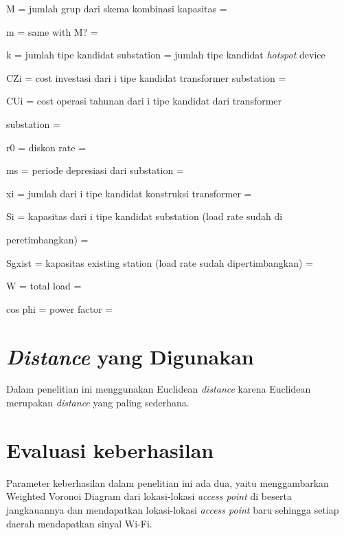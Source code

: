M = jumlah grup dari skema kombinasi kapasitas =  

m = same with M? =

k = jumlah tipe kandidat substation = jumlah tipe kandidat \textit{hotspot} device

CZi = cost investasi dari i tipe kandidat transformer substation = 

CUi = cost operasi tahunan dari i tipe kandidat dari transformer 

substation =

r0 = diskon rate = 

ms = periode depresiasi dari substation = 

xi = jumlah dari i tipe kandidat konstruksi transformer = 

Si = kapasitas dari i tipe kandidat substation (load rate sudah di 

peretimbangkan) =

Sgxist = kapasitas existing station (load rate sudah dipertimbangkan) = 

W = total load = 

cos phi = power factor = 

\section{\textit{Distance} yang Digunakan}
Dalam penelitian ini menggunakan Euclidean \textit{distance} karena Euclidean merupakan \textit{distance} yang paling sederhana. 

\section{Evaluasi keberhasilan}
Parameter keberhasilan dalam penelitian ini ada dua, yaitu menggambarkan Weighted Voronoi Diagram dari lokasi-lokasi \textit{access point} di {\ui} beserta jangkauannya dan mendapatkan lokasi-lokasi \textit{access point} baru sehingga setiap daerah mendapatkan sinyal Wi-Fi.



